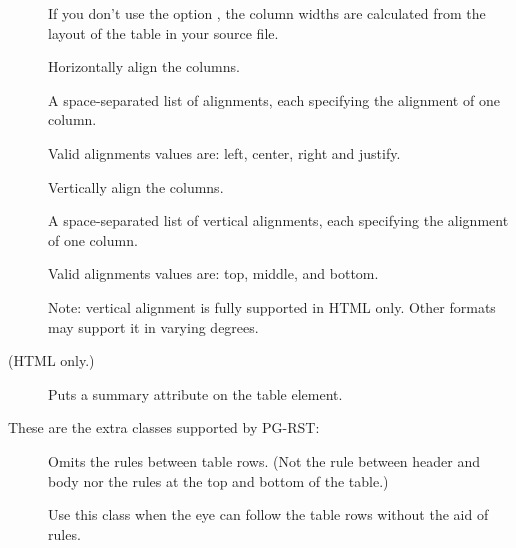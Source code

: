 \documentclass[a5paper]{book}
\begin{document}
\begin{german}
\begin{description}
If you don’t use the option {}, the column widths
are calculated from the layout of the table in your source file.\par

\item[{\ttfamily{{\addfontfeature{Color=00FF00}{aligns}}}}] 

Horizontally align the columns.\par

A space-separated list of alignments, each specifying the
alignment of one column.\par

Valid alignments values are: left, center, right and justify.\par

\item[{\ttfamily{{\addfontfeature{Color=00FF00}{vertical-aligns}}}}] 

Vertically align the columns.\par

A space-separated list of vertical alignments, each specifying the
alignment of one column.\par

Valid alignments values are: top, middle, and bottom.\par

Note: vertical alignment is fully supported in HTML only. Other
formats may support it in varying degrees.\par

\item[{\ttfamily{{\addfontfeature{Color=00FF00}{summary}}}} (HTML only.)] 

Puts a summary attribute on the table element.\par
\end{description}

These are the extra classes supported by PG-RST:\par

\begin{description}
\item[{}] 

Omits the rules between table rows. (Not the rule between header
and body nor the rules at the top and bottom of the table.)\par

Use this class when the eye can follow the table rows without the
aid of rules.\par
\end{description}


\end{german}
\end{document}
